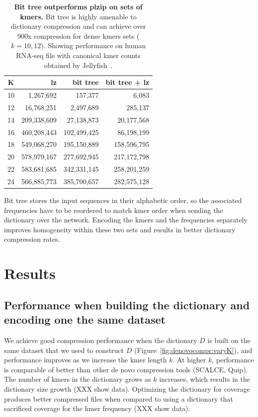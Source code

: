 \documentclass[12pt]{cmuthesis}
\begin{document}
\begin{table}[ht]
  \centering
  \begin{tabular}{c r r r}
  \toprule
  K & lz & bit tree & bit tree + lz \\
  \midrule
  10 & 1,267,692 & 157,377 & 6,083 \\
  12 & 16,768,251 &  2,497,689 & 285,137 \\
  14 & 209,338,609 & 27,138,873 &  20,177,568 \\
  16 & 460,208,443 & 102,499,425 & 86,198,199 \\
  18 & 549,068,270 & 195,150,889 & 158,596,795 \\
  20 & 578,979,167 & 277,692,945 & 217,172,798 \\
  22 & 583,681,685 & 342,331,145 & 258,201,259 \\
  24 & 566,885,773 & 385,700,657 & 282,575,128 \\
  \bottomrule
  \end{tabular}
  \caption{ \textbf{Bit tree outperforms plzip on sets of kmers.} Bit tree is highly amenable to dictionary compression and can achieve over 900x compression for dense kmers sets ($k=10,12$). Showing performance on human RNA-seq file with canonical kmer counts obtained by Jellyfish~\cite{Jellyfish}.}
  \label{fig:denovo:bittree}
\end{table}

Bit tree stores the input sequences in their alphabetic order, so the associated frequencies have to be reordered to match kmer order when sending the dictionary over the network. Encoding the kmers and the frequencies separately improves homogeneity within these two sets and results in better dictionary compression rates.

\section{Results}

  \subsection{Performance when building the dictionary and encoding one the same dataset}

  We achieve good compression performance when the dictionary $D$ is built on the same dataset that we used to construct $D$ (Figure~\ref{fig:denovocompr:varyK}), and performance improves as we increase the kmer length $k$. At higher $k$, performance is comparable of better than other de novo compression tools (SCALCE, Quip). The number of kmers in the dictionary grows as $k$ increases, which results in the dictionary size growth (XXX show data). Optimizing the dictionary for coverage produces better compressed files when compared to using a dictionary that sacrificed coverage for the kmer frequency (XXX show data).
  
\end{document}
